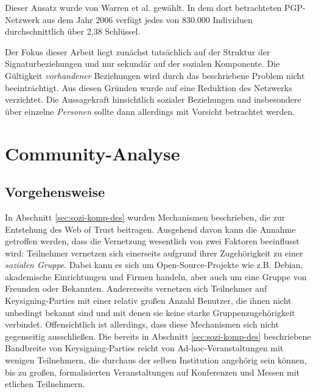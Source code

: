 Dieser Ansatz wurde von Warren et al. \cite{Warren2007} gewählt. In
dem dort betrachteten PGP-Netzwerk aus dem Jahr 2006 verfügt jedes
von 830.000 Individuen durchschnittlich über 2,38 Schlüssel.

Der Fokus dieser Arbeit liegt zunächst tatsächlich auf der Struktur
der Signaturbeziehungen und nur sekundär auf der sozialen
Komponente. Die Gültigkeit \emph{vorhandener} Beziehungen wird durch
das beschriebene Problem nicht beeintr\"achtigt. Aus diesen Gründen
wurde auf eine Reduktion des Netzwerks verzichtet. Die Aussagekraft
hinsichtlich sozialer Beziehungen und insbesondere über einzelne
\emph{Personen} sollte dann allerdings mit Vorsicht betrachtet werden.

\section{Community-Analyse}
\label{sec:community-analyse}

\subsection{Vorgehensweise}
\label{sec:vorgehensweise}

In Abschnitt \ref{sec:sozi-komp-des} wurden Mechanismen beschrieben,
die zur Entstehung des Web of Trust beitragen. Ausgehend davon kann
die Annahme getroffen werden, dass die Vernetzung wesentlich von zwei
Faktoren beeinflusst wird: Teilnehmer vernetzen sich einerseits
aufgrund ihrer Zugehörigkeit zu einer \emph{sozialen Gruppe}. Dabei
kann es sich um Open-Source-Projekte wie z.B. Debian, akademische
Einrichtungen und Firmen handeln, aber auch um eine Gruppe von
Freunden oder Bekannten. Andererseits vernetzen sich Teilnehmer auf
Keysigning-Parties mit einer relativ großen Anzahl Benutzer, die ihnen
nicht unbedingt bekannt sind und mit denen sie keine starke
Gruppenzugehörigkeit verbindet. Offensichtlich ist allerdings, dass
diese Mechanismen sich nicht gegenseitig ausschließen. Die bereits in
Abschnitt \ref{sec:sozi-komp-des} beschriebene Bandbreite von
Keysigning-Parties reicht von Ad-hoc-Veranstaltungen mit wenigen
Teilnehmern, die durchaus der selben Institution angehörig sein
können, bis zu großen, formalisierten Veranstaltungen auf Konferenzen
und Messen mit etlichen Teilnehmern.

